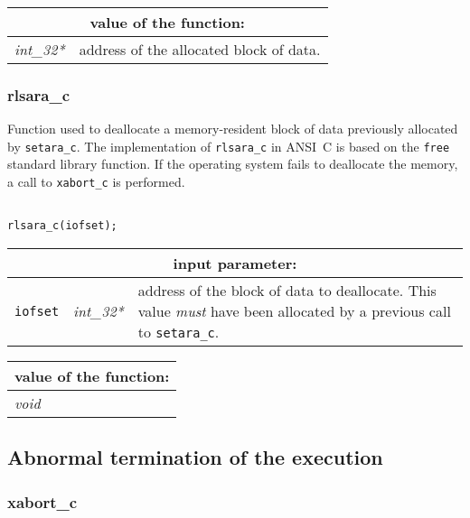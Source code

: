\vskip 0.8cm

\noindent
\begin{tabular}{|p{4.0cm}|p{11cm}|}
\hline
\multicolumn{2}{|c|}{\bf value of the function:} \\
\hline
{\it int\_32*} & address of the allocated block of data. \\
\hline
\end{tabular}

\subsubsection{rlsara\_c}\label{sect:rlsara}

Function used to deallocate a memory-resident block of data previously allocated by {\tt setara\_c}.
The implementation of {\tt rlsara\_c} in ANSI~C is based on the {\tt free} standard library function. If the operating system fails to deallocate
the memory, a call to {\tt xabort\_c} is performed.

\begin{verbatim}

rlsara_c(iofset);
\end{verbatim}

\noindent
\begin{tabular}{|p{1.5cm}|p{2cm}|p{11cm}|}
\hline
\multicolumn{3}{|c|}{\bf input parameter:} \\
\hline
{\tt iofset} & {\it int\_32*} & address of the block of data to deallocate. This value {\sl must} have been allocated by a previous call to {\tt setara\_c}. \\
\hline
\end{tabular}
\vskip 0.8cm

\noindent
\begin{tabular}{|p{4.0cm}|p{11cm}|}
\hline
\multicolumn{2}{|c|}{\bf value of the function:} \\
\hline
{\it void} &  \\
\hline
\end{tabular}

\vskip 0.8cm

\subsection{Abnormal termination of the execution}

\subsubsection{xabort\_c}

